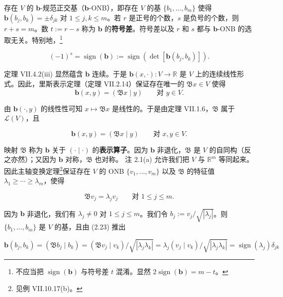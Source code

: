 \begin{remark}

\begin{items}
\item

存在 $ V $ 的 $ \mathbf{b} $-规范正交基（$ \mathbf{b} $-ONB），即存在 $ V $ 的基 $ \{b_1, \ldots, b_m\} $ 使得 $ \mathbf{b}(b_j, b_k) = \pm \delta_{jk} $ 对 $ 1 \le j, k \le m $。若 $ r $ 是正号的个数，$ s $ 是负号的个数，则 $ r + s = m $。数 $ t := r - s $ 称为 $ \mathbf{b} $ 的\textbf{符号差}。符号差以及 $ r $ 和 $ s $ 都与 $ \mathbf{b} $-ONB 的选取无关。特别地，\footnote{不应当把 $ \operatorname{sign}(\mathbf{b}) $ 与符号差 $ t $ 混淆。显然 $ 2\operatorname{sign}(\mathbf{b}) = m - t $。}

\[
(-1)^s = \operatorname{sign}(\mathbf{b}) := \operatorname{sign}(\det[\mathbf{b}(b_j, b_k)]) .
\]

\proofhead
定理 VII.4.2(iii) 显然蕴含 $ \mathbf{b} $ 连续。于是 $ \mathbf{b}(x, \cdot): V \to \mathbb{R} $ 是 $ V $ 上的连续线性形式。因此，里斯表示定理（定理 VII.2.14）保证存在唯一的 $ \mathfrak{B}x \in V $ 使得
\[
\mathbf{b}(x,y) = (\mathfrak{B}x \mid y) \qquad \text{对 } y \in V.
\]

由 $ \mathbf{b}(\cdot, y) $ 的线性性可知 $ x \mapsto \mathfrak{B}x $ 是线性的。于是由定理 VII.1.6，$ \mathfrak{B} $ 属于 $ \mathcal{L}(V) $，且

\[
\mathbf{b}(x,y) = (\mathfrak{B}x \mid y) \qquad \text{对 } x, y \in V.
\]

映射 $ \mathfrak{B} $ 称为 $ \mathbf{b} $ 关于 $ (\cdot \mid \cdot) $ 的\textbf{表示算子}。因为 $ \mathbf{b} $ 非退化，$ \mathfrak{B} $ 是 $ V $ 的自同构（反之亦然）；又因为 $ \mathbf{b} $ 对称，$ \mathfrak{B} $ 也对称。
注 2.1(a) 允许我们把 $ V $ 与 $ \mathbb{R}^m $ 等同起来。因此主轴变换定理\footnote{见例 VII.10.17(b)。}保证存在 $ V $ 的 ONB $ \{v_1, \ldots, v_m\} $ 以及 $ \mathfrak{B} $ 的特征值 $ \lambda_1 \ge \cdots \ge \lambda_m $，使得

\begin{equation}
\mathfrak{B}v_j = \lambda_j v_j \qquad \text{对 } 1 \le j \le m.\tag{2.23}
\end{equation}

因为 $ \mathbf{b} $ 非退化，我们有 $ \lambda_j \neq 0 $ 对 $ 1 \le j \le m $。我们令 $ b_j := v_j / \sqrt{|\lambda_j|} $。则 $ \{b_1, \ldots, b_m\} $ 是 $ V $ 的基，且由 (2.23) 推出

\[
\mathbf{b}(b_j, b_k) = (\mathfrak{B}b_j \mid b_k) = (\mathfrak{B}v_j \mid v_k)/\sqrt{|\lambda_j \lambda_k|} = \lambda_j (v_j \mid v_k)/\sqrt{|\lambda_j \lambda_k|} = \operatorname{sign}(\lambda_j)\delta_{jk}
\]


\end{items}
\end{remark}
